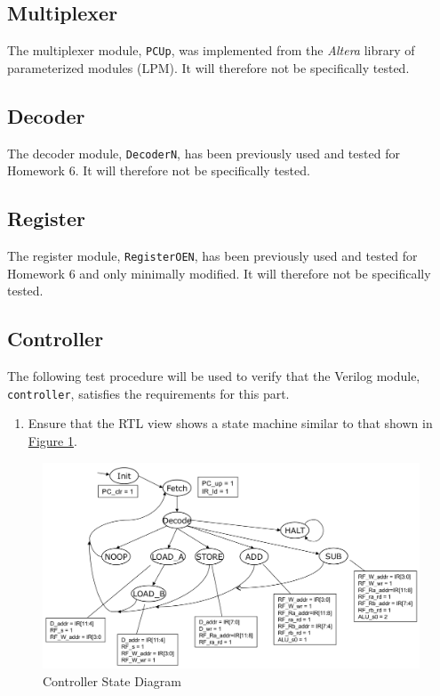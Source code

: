 \subsection{Multiplexer} %
\label{sub:multiplexer}

The multiplexer module, \verb|PCUp|, was implemented from the \emph{Altera} library of parameterized modules (LPM).
It will therefore not be specifically tested.


\subsection{Decoder} %
\label{sub:decoder}

The decoder module, \verb|DecoderN|, has been previously used and tested for Homework 6.
It will therefore not be specifically tested.

\subsection{Register} %
\label{sub:register}

The register module, \verb|RegisterOEN|, has been previously used and tested for Homework 6 and only minimally modified.
It will therefore not be specifically tested.

\FloatBarrier \subsection{Controller} %
\label{sub:controller_pro}

The following test procedure will be used to verify that the Verilog module, \verb|controller|, satisfies the requirements for this part.

\begin{enumerate}
    \item Ensure that the RTL view shows a state machine similar to that shown in \hyperref[fig:state_diagram]{Figure \ref*{fig:state_diagram}}.
\end{enumerate}

\begin{figure}[htbp]
    \includegraphics[width=\textwidth]{images/state_diagram.png}
    \caption{Controller State Diagram\label{fig:state_diagram}}
\end{figure}

